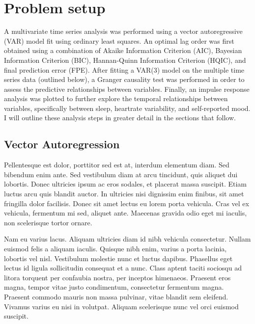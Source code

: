 \documentclass{article}
\begin{document}
\hypertarget{methods}{%
\section{Problem setup}\label{methods}}

A multivariate time series analysis was performed using a vector autoregressive
(VAR) model fit using ordinary least squares. An optimal lag order was first
obtained using a combination of Akaike Information Criterion (AIC), Bayesian
Information Criterion (BIC), Hannan-Quinn Information Criterion (HQIC), and
final prediction error (FPE). After fitting a VAR(3) model on the multiple time
series data (outlined below), a Granger causality test was performed in order to
assess the predictive relationships between variables. Finally, an impulse
response analysis was plotted to further explore the temporal relationships
between variables, specifically between sleep, heartrate variability, and
self-reported mood. I will outline these analysis steps in greater detail in the
sections that follow.

\hypertarget{vector-autoregression}{%
\subsection{Vector Autoregression}\label{vector-autoregression}}

\citep{seabold2010statsmodels}

\citep{lutkepohlNew2005}

Pellentesque est dolor, porttitor sed est at, interdum elementum diam.
Sed bibendum enim ante. Sed vestibulum diam at arcu tincidunt, quis
aliquet dui lobortis. Donec ultricies ipsum ac eros sodales, et placerat
massa suscipit. Etiam luctus arcu quis blandit auctor. In ultricies nisi
dignissim enim finibus, sit amet fringilla dolor facilisis. Donec sit
amet lectus eu lorem porta vehicula. Cras vel ex vehicula, fermentum mi
sed, aliquet ante. Maecenas gravida odio eget mi iaculis, non
scelerisque tortor ornare.

Nam eu varius lacus. Aliquam ultricies diam id nibh vehicula
consectetur. Nullam euismod felis a aliquam iaculis. Quisque nibh enim,
varius a porta lacinia, lobortis vel nisl. Vestibulum molestie nunc et
luctus dapibus. Phasellus eget lectus id ligula sollicitudin consequat
et a nunc. Class aptent taciti sociosqu ad litora torquent per confaubia
nostra, per inceptos himenaeos. Praesent eros magna, tempor vitae justo
condimentum, consectetur fermentum magna. Praesent commodo mauris non
massa pulvinar, vitae blandit sem eleifend. Vivamus varius eu nisi in
volutpat. Aliquam scelerisque nunc vel orci euismod suscipit.
\end{document}
